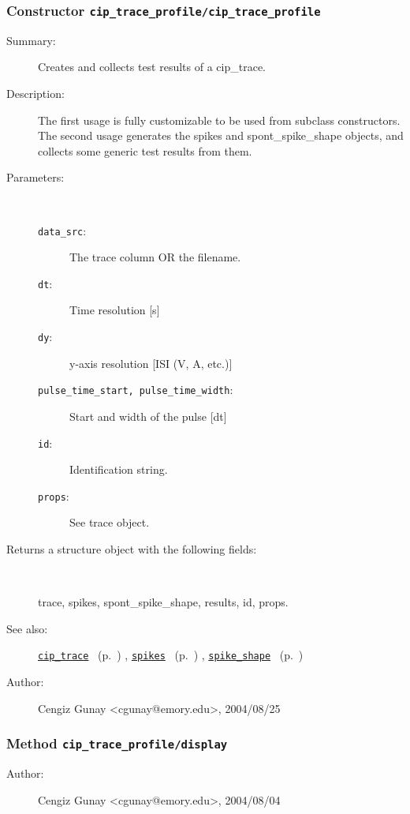 \subsubsection[Constructor \texttt{cip\_trace\_profile}]{Constructor \texttt{cip\_trace\_profile/cip\_trace\_profile}}%
%
\label{ref_cip_trace_profile__cip_trace_profile}%
\hypertarget{ref_cip_trace_profile__cip_trace_profile}{}%
\begin{description}
\item[Summary:]Creates and collects test results of a cip\_trace.
%
%
\item[Description:]%
The first usage is fully customizable to be used from subclass constructors.
 The second usage generates the spikes and spont\_spike\_shape objects, and
 collects some generic test results from them. 
\item[Parameters:]~
\begin{description}%
\item[\texttt{data\_src}:]
 The trace column OR the filename.
\item[\texttt{dt}:]
 Time resolution [s]
\item[\texttt{dy}:]
 y-axis resolution [ISI (V, A, etc.)]
\item[\texttt{pulse\_time\_start, pulse\_time\_width}:]


Start and width of the pulse [dt]\item[\texttt{id}:]
 Identification string.
\item[\texttt{props}:]
 See trace object.
\end{description}%
%
\item[Returns a structure object with the following fields:]~

	trace, spikes, spont\_spike\_shape, results, id, props.
%
%
\item[See also:]%
\hyperlink{ref_cip_trace}{\texttt{cip\_trace}}%
\ (p.~\pageref{ref_cip_trace})%
%
, \hyperlink{ref_spikes}{\texttt{spikes}}%
\ (p.~\pageref{ref_spikes})%
%
, \hyperlink{ref_spike_shape}{\texttt{spike\_shape}}%
\ (p.~\pageref{ref_spike_shape})%
%
%
\item[Author:]%
Cengiz Gunay <cgunay@emory.edu>, 2004/08/25%
\end{description}
\methodline%
\subsubsection[Method \texttt{display}]{Method \texttt{cip\_trace\_profile/display}}%
%
\label{ref_cip_trace_profile__display}%
\hypertarget{ref_cip_trace_profile__display}{}%
\begin{description}
%
%
%
%
%
%
%
\item[Author:]%
Cengiz Gunay <cgunay@emory.edu>, 2004/08/04%
\end{description}
\methodline%
